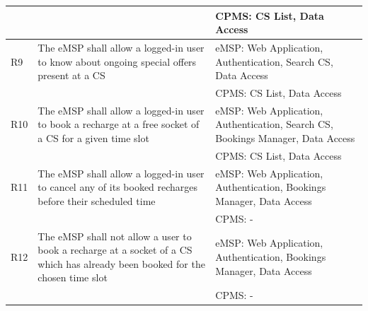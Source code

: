 \documentclass[11pt]{article}
\begin{document}
\begin{table}[H]
\begin{tabularx}{\textwidth}{|>{\centering\hsize=0.15\hsize}X|>{\hsize=1.425\hsize}X|>{\hsize=1.425\hsize}X|}
        & & CPMS: CS List, Data Access \\
        \hline
        R9 & The eMSP shall allow a logged-in user to know about ongoing special offers present at a CS & eMSP: Web Application, Authentication, Search CS, Data Access \\
        & & CPMS: CS List, Data Access \\
        \hline
        R10 & The eMSP shall allow a logged-in user to book a recharge at a free socket of a CS for a given time slot & eMSP: Web Application, Authentication, Search CS, Bookings Manager, Data Access \\
        & & CPMS: CS List, Data Access \\
        \hline
        R11 & The eMSP shall allow a logged-in user to cancel any of its booked recharges before their scheduled time & eMSP: Web Application, Authentication, Bookings Manager, Data Access \\
        & & CPMS: - \\
        \hline
        R12 & The eMSP shall not allow a user to book a recharge at a socket of a CS which has already been booked for the chosen time slot & eMSP: Web Application, Authentication, Bookings Manager, Data Access \\
        & & CPMS: - \\
        \hline
    \end{tabularx}
    \label{tab:requirements}
\end{table}
\end{document}
